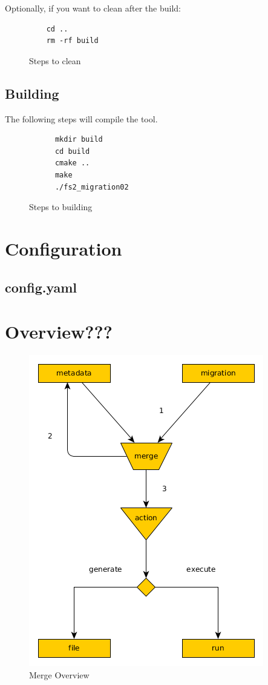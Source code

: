 \documentclass[]{article}
\begin{document}
Optionally, if you want to clean after the build:
\begin{figure}[H]
	\begin{lstlisting}
	cd ..
	rm -rf build
	\end{lstlisting}
	\caption{Steps to clean}
\end{figure}


\subsection{Building \protect }
The following steps will compile the  tool. 
\begin{figure}[H]
	\begin{lstlisting}
	  mkdir build
	  cd build
	  cmake ..
	  make
	  ./fs2_migration02
	\end{lstlisting}
	\caption{Steps to building}
\end{figure}

\section{Configuration}
\subsection{config.yaml}

\section{Overview???}

\begin{figure}[H]
	\centering
	\includegraphics[scale=0.45]{fs2_merge_1a.png}
	\caption{Merge Overview}
\end{figure}
\end{document}
